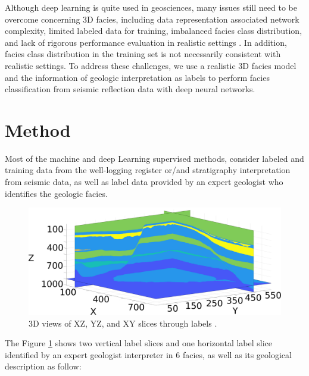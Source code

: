 \documentclass[twoside,letterpaper,twocolumn]{article}
\begin{document}
Although deep learning is quite used in geosciences, many issues still need to be overcome concerning 3D facies, including data representation associated network complexity, limited labeled data for training, imbalanced facies class distribution, and lack of rigorous performance evaluation in realistic settings \citep{liu(2020)}. 
In addition, facies class distribution in the training set is not necessarily consistent with realistic settings. 
To address these challenges, we use a realistic 3D facies model and the information of geologic interpretation as labels to perform facies classification from seismic reflection data with deep neural networks.

\section{Method}

Most of the machine and deep Learning supervised methods, consider labeled and training data from the well-logging register or/and stratigraphy interpretation from seismic data, as well as label data provided by an expert geologist who identifies the geologic facies.
\begin{figure}[h!]
	\centering
	\includegraphics[width=\columnwidth]{Figures/label_example.pdf}
	\caption{3D views of XZ, YZ, and XY slices through labels \citep{seismicchalenge(2020)}.}
	\label{fig:label_axample}
\end{figure}

The Figure \ref{fig:label_axample} shows two vertical label slices and one horizontal label slice identified by an expert geologist interpreter in 6 facies, as well as its geological description \citep{seismicchalenge(2020)} as follow:
\end{document}

